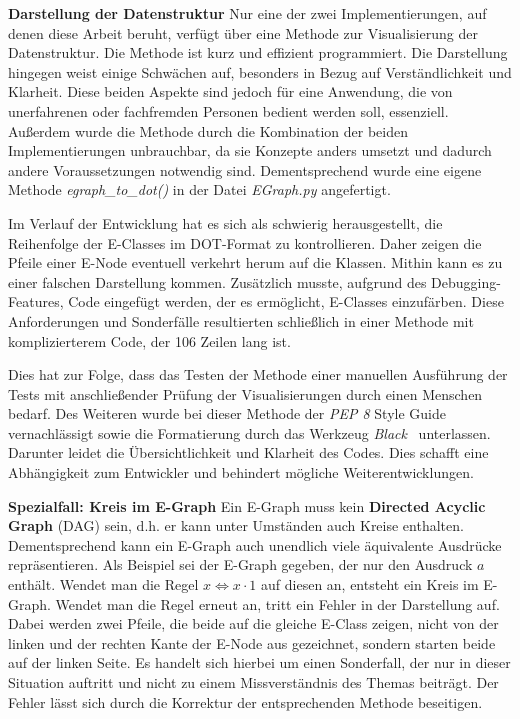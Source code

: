 \noindent\textbf{Darstellung der Datenstruktur} Nur eine der zwei Implementierungen, auf denen diese Arbeit beruht, verfügt über eine Methode zur Visualisierung der Datenstruktur.
Die Methode ist kurz und effizient programmiert. Die Darstellung hingegen weist einige Schwächen auf, besonders in Bezug auf Verständlichkeit und Klarheit.
Diese beiden Aspekte sind jedoch für eine Anwendung, die von unerfahrenen oder fachfremden Personen bedient werden soll, essenziell.
Außerdem wurde die Methode durch die Kombination der beiden Implementierungen unbrauchbar, da sie Konzepte anders umsetzt und dadurch andere Voraussetzungen notwendig sind.
Dementsprechend wurde eine eigene Methode \textit{egraph\_to\_dot()} in der Datei \textit{EGraph.py} angefertigt.

Im Verlauf der Entwicklung hat es sich als schwierig herausgestellt, die Reihenfolge der E-Classes im DOT-Format zu kontrollieren.
Daher zeigen die Pfeile einer E-Node eventuell verkehrt herum auf die Klassen. Mithin kann es zu einer falschen Darstellung kommen.
Zusätzlich musste, aufgrund des Debugging-Features, Code eingefügt werden, der es ermöglicht, E-Classes einzufärben.
Diese Anforderungen und Sonderfälle resultierten schließlich in einer Methode mit komplizierterem Code, der 106 Zeilen lang ist.

Dies hat zur Folge, dass das Testen der Methode einer manuellen Ausführung der Tests mit anschließender Prüfung der Visualisierungen durch einen Menschen bedarf.
Des Weiteren wurde bei dieser Methode der \textit{PEP 8} Style Guide~\cite{pep} vernachlässigt sowie die Formatierung durch das Werkzeug \textit{Black}~\cite{black} unterlassen.
Darunter leidet die Übersichtlichkeit und Klarheit des Codes. Dies schafft eine Abhängigkeit zum Entwickler und behindert mögliche Weiterentwicklungen.

\noindent\textbf{Spezialfall: Kreis im E-Graph} Ein E-Graph muss kein \textbf{Directed Acyclic Graph} (DAG) sein, d.h. er kann unter Umständen auch Kreise enthalten. 
Dementsprechend kann ein E-Graph auch unendlich viele äquivalente Ausdrücke repräsentieren.
Als Beispiel sei der E-Graph gegeben, der nur den Ausdruck $a$ enthält. Wendet man die Regel $x \Leftrightarrow x \cdot 1$ auf diesen an, entsteht ein Kreis im E-Graph.
Wendet man die Regel erneut an, tritt ein Fehler in der Darstellung auf. Dabei werden zwei Pfeile, die beide auf die gleiche E-Class zeigen, nicht von der linken und der rechten
Kante der E-Node aus gezeichnet, sondern starten beide auf der linken Seite. Es handelt sich hierbei um einen Sonderfall, der nur in dieser Situation auftritt und nicht zu einem 
Missverständnis des Themas beiträgt. Der Fehler lässt sich durch die Korrektur der entsprechenden Methode beseitigen.

